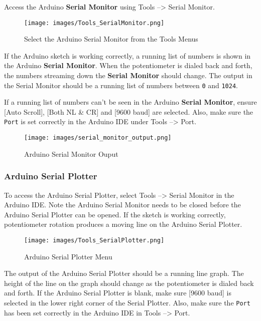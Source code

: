 \documentclass{book}
\makeatletter
\def\maxwidth{\ifdim\Gin@nat@width>\linewidth\linewidth
\else\Gin@nat@width\fi}
\let\Oldincludegraphics\includegraphics
\renewcommand{\includegraphics}[1]{\Oldincludegraphics[width=.8\maxwidth]{#1}}
\newcommand{\passthrough}[1]{#1}
\makeatother
\begin{document}
Access the Arduino \textbf{Serial Monitor} using Tools --\textgreater{}
Serial Monitor.

\begin{figure}
\centering
\texttt{[image: images/Tools\_SerialMonitor.png]}
\caption{Select the Arduino Serial Monitor from the Tools Menus}
\end{figure}
    




    
        If the Arduino sketch is working correctly, a running list of numbers is
shown in the Arduino \textbf{Serial Monitor}. When the potentiometer is
dialed back and forth, the numbers streaming down the \textbf{Serial
Monitor} should change. The output in the Serial Monitor should be a
running list of numbers between \passthrough{\lstinline!0!} and
\passthrough{\lstinline!1024!}.

If a running list of numbers can't be seen in the Arduino \textbf{Serial
Monitor}, ensure {[}Auto Scroll{]}, {[}Both NL \& CR{]} and {[}9600
baud{]} are selected. Also, make sure the \passthrough{\lstinline!Port!}
is set correctly in the Arduino IDE under Tools --\textgreater{} Port.

\begin{figure}
\centering
\texttt{[image: images/serial\_monitor\_output.png]}
\caption{Arduino Serial Monitor Ouput}
\end{figure}
    




    
        \hypertarget{arduino-serial-plotter}{%
\subsubsection{Arduino Serial Plotter}\label{arduino-serial-plotter}}

To access the Arduino Serial Plotter, select Tools --\textgreater{}
Serial Monitor in the Arduino IDE. Note the Arduino Serial Monitor needs
to be closed before the Arduino Serial Plotter can be opened. If the
sketch is working correctly, potentiometer rotation produces a moving
line on the Arduino Serial Plotter.

\begin{figure}
\centering
\texttt{[image: images/Tools\_SerialPlotter.png]}
\caption{Arduino Serial Plotter Menu}
\end{figure}

The output of the Arduino Serial Plotter should be a running line graph.
The height of the line on the graph should change as the potentiometer
is dialed back and forth. If the Arduino Serial Plotter is blank, make
sure {[}9600 baud{]} is selected in the lower right corner of the Serial
Plotter. Also, make sure the \passthrough{\lstinline!Port!} has been set
correctly in the Arduino IDE in Tools --\textgreater{} Port.
\end{document}
